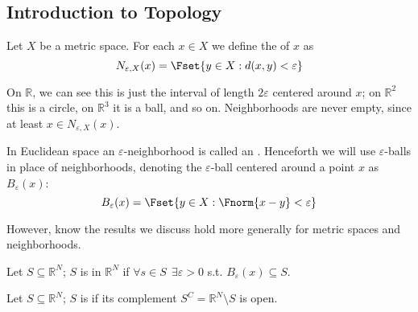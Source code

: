 \documentclass{article}
\begin{document}
\subsection{Introduction to Topology}
\label{sub:introduction_to_topology}

\begin{definition}\label{def:lecture1_neighborhood}
  Let $X$ be a metric space. For each $x \in X$ we define the  of $x$ as
  \[
    N_{\varepsilon, X}(x) = \Fset{y \in X: d(x, y) < \varepsilon}
  \]
\end{definition}

On $\mathbb{R}$, we can see this is just the interval of length $2\varepsilon$ centered around $x$; on $\mathbb{R}^2$ this is a circle, on $\mathbb{R}^3$ it is a ball, and so on. Neighborhoods are never empty, since at least $x \in N_{\varepsilon, X}(x)$.
\begin{remark}
  In Euclidean space an $\varepsilon$-neighborhood is called an . Henceforth we will use $\varepsilon$-balls in place of neighborhoods, denoting the $\varepsilon$-ball centered around a point $x$ as $B_{\varepsilon}(x)$:
  \[
    B_{\varepsilon}(x) = \Fset{y \in X: \Fnorm{x - y} < \varepsilon}
  \]

  However, know the results we discuss hold more generally for metric spaces and neighborhoods.
\end{remark}

\begin{definition}[open]\label{def:lecture1_open_set}
  Let $S \subseteq \mathbb{R}^{N}$; $S$ is  in $\mathbb{R}^N$ if $\forall s \in S ~~ \exists \varepsilon > 0$ s.t. $B_{\varepsilon}(x) \subseteq S$.
\end{definition}

\begin{definition}[closed]\label{def:lecture1_closed_set}
  Let $S \subseteq \mathbb{R}^{N}$; $S$ is  if its complement $S^C = \mathbb{R}^N \setminus S$ is open.
\end{definition}
\end{document}
